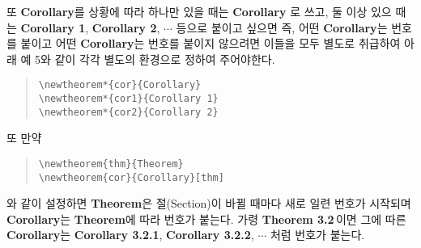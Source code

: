 \documentclass[a4paper,10pt]{amsproc}
\newlength\hunindentlen
\def\gethunindentlen#1{%
 \sbox{\mybox}{\textbf{#1.}}%
 \setlength\hunindentlen{\wd\mybox}%
 \addtolength\hunindentlen{5mm}%
}
\begin{document}
또 \textbf{Corollary}를 상황에 따라 하나만 있을 때는 \textbf{Corollary}
로 쓰고, 둘 이상 있으 때는 \textbf{Corollary 1}, \textbf{Corollary 2},
$\cdots$ 등으로 붙이고 싶으면 즉, 어떤 \textbf{Corollary}는 번호를 붙이고
어떤 \textbf{Corollary}는 번호를 붙이지 않으려면 이들을 모두 별도로
취급하여 아래 예 5와 같이 각각 별도의 환경으로 정하여 주어야한다.
\begin{quote}
\noindent\gethunindentlen{예 5}
\hspace*{-\hunindentlen}\usebox{\mybox}\hspace{4mm}\verb|\newtheorem*{cor}{Corollary}| \\
   \verb|\newtheorem*{cor1}{Corollary 1}| \\
   \verb|\newtheorem*{cor2}{Corollary 2}|
\end{quote}
또 만약
\begin{quote}
\noindent\gethunindentlen{예 6}
\hspace*{-\hunindentlen}\usebox{\mybox}\hspace{4mm}\verb|\newtheorem{thm}{Theorem}| \\
   \verb|\newtheorem{cor}{Corollary}[thm]|
\end{quote}
와 같이 설정하면 \textbf{Theorem}은 절(Section)이 바뀔 때마다 새로
일련 번호가 시작되며 \textbf{Corollary}는 \textbf{Theorem}에 따라
번호가 붙는다. 가령 \textbf{Theorem 3.2}\,이면 그에 따른
\textbf{Corollary}는 \textbf{Corollary 3.2.1}, \textbf{Corollary
  3.2.2}, $\cdots$ 처럼 번호가 붙는다.
\end{document}

